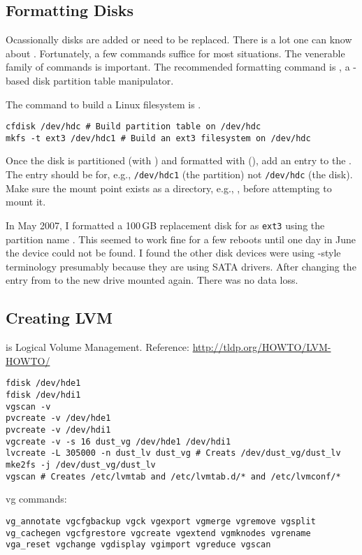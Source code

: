 \documentclass[12pt,twoside]{article}
\begin{document}
\subsection{Formatting Disks}\label{sxn:fmt}
Ocassionally disks are added or need to be replaced.
There is a lot one can know about .
Fortunately, a few commands suffice for most situations.
The venerable  family of commands is important.
The recommended formatting command is , a
-based disk partition table manipulator.

The command to build a Linux filesystem is .
\begin{verbatim}
cfdisk /dev/hdc # Build partition table on /dev/hdc
mkfs -t ext3 /dev/hdc1 # Build an ext3 filesystem on /dev/hdc
\end{verbatim}
Once the disk is partitioned (with ) and formatted 
with (), add an entry to the .
The entry should be for, e.g., \texttt{/dev/hdc1} (the partition) 
not \texttt{/dev/hdc} (the disk).
Make sure the mount point exists as a directory, e.g., ,
before attempting to mount it.

In May 2007, I formatted a 100\,GB replacement disk for
 as \texttt{ext3} using the partition name
. 
This seemed to work fine for a few reboots until one day in June
the  device could not be found.
I found the other disk devices were using -style
terminology presumably because they are using SATA drivers.
After changing the  entry from  to
 the new drive mounted again.
There was no data loss.
 

\subsection{Creating LVM}\label{sxn:lvm_mk}
 is Logical Volume Management.
Reference: \url{http://tldp.org/HOWTO/LVM-HOWTO/}

\begin{verbatim}
fdisk /dev/hde1
fdisk /dev/hdi1
vgscan -v
pvcreate -v /dev/hde1
pvcreate -v /dev/hdi1
vgcreate -v -s 16 dust_vg /dev/hde1 /dev/hdi1
lvcreate -L 305000 -n dust_lv dust_vg # Creats /dev/dust_vg/dust_lv
mke2fs -j /dev/dust_vg/dust_lv
vgscan # Creates /etc/lvmtab and /etc/lvmtab.d/* and /etc/lvmconf/*
\end{verbatim}

vg commands:
\begin{verbatim}
vg_annotate vgcfgbackup vgck vgexport vgmerge vgremove vgsplit
vg_cachegen vgcfgrestore vgcreate vgextend vgmknodes vgrename
vga_reset vgchange vgdisplay vgimport vgreduce vgscan
\end{verbatim}
\end{document}
